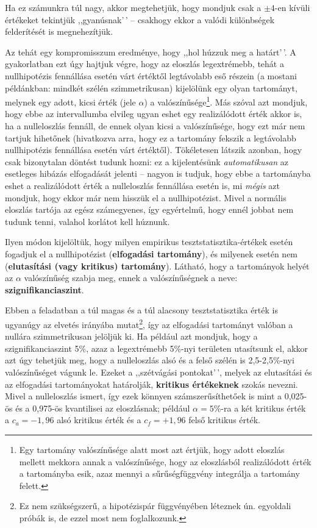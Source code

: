 \documentclass[
]{book}
\begin{document}
Ha ez számunkra túl nagy, akkor megtehetjük, hogy mondjuk csak a \(\pm 4\)-en kívüli értékeket tekintjük ,,gyanúsnak'\,' -- csakhogy ekkor a valódi különbségek felderítését is megnehezítjük.

Az tehát egy kompromisszum eredménye, hogy ,,hol húzzuk meg a határt'\,'. A gyakorlatban ezt úgy hajtjuk végre, hogy az eloszlás legextrémebb, tehát a nullhipotézis fennállása esetén várt értéktől legtávolabb eső részein (a mostani példánkban: mindkét szélén szimmetrikusan) kijelölünk egy olyan tartományt, melynek egy adott, kicsi érték (jele \(\alpha\)) a valószínűsége\footnote{Egy tartomány valószínűsége alatt most azt értjük, hogy adott eloszlás mellett mekkora annak a valószínűsége, hogy az eloszlásból realizálódott érték a tartományba esik, azaz mennyi a sűrűségfüggvény integrálja a tartomány felett.}. Más szóval azt mondjuk, hogy ebbe az intervallumba elvileg ugyan eshet egy realizálódott érték akkor is, ha a nulleloszlás fennáll, de ennek olyan kicsi a valószínűsége, hogy ezt már nem tartjuk hihetőnek (hivatkozva arra, hogy ez a tartomány fekszik a legtávolabb nullhipotézis fennállása esetén várt értéktől). Tökéletesen látszik azonban, hogy csak bizonytalan döntést tudunk hozni: ez a kijelentésünk \emph{automatikusan} az esetleges hibázás elfogadását jelenti -- nagyon is tudjuk, hogy ebbe a tartományba eshet a realizálódott érték a nulleloszlás fennállása esetén is, mi \emph{mégis} azt mondjuk, hogy ekkor már nem hisszük el a nullhipotézist. Mivel a normális eloszlás tartója az egész számegyenes, így egyértelmű, hogy ennél jobbat nem tudunk tenni, valahol korlátot kell húznunk.

Ilyen módon kijelöltük, hogy milyen empirikus tesztstatisztika-értékek esetén fogadjuk el a nullhipotézist (\textbf{elfogadási tartomány}), és milyenek esetén nem (\textbf{elutasítási (vagy kritikus) tartomány}). Látható, hogy a tartományok helyét az \(\alpha\) valószínűség szabja meg, ennek a valószínűségnek a neve: \textbf{szignifikanciaszint}.

Ebben a feladatban a túl magas és a túl alacsony tesztstatisztika érték is ugyanúgy az elvetés irányába mutat\footnote{Ez nem szükségszerű, a hipotézispár függvényében léteznek ún. egyoldali próbák is, de ezzel most nem foglalkozunk.}, így az elfogadási tartományt valóban a nullára szimmetrikusan jelöljük ki. Ha például azt mondjuk, hogy a szignifikanciaszint 5\%, azaz a legextrémebb 5\%-nyi területen utasítsunk el, akkor azt úgy tehetjük meg, hogy a nulleloszlás alsó és a felső szélén is 2,5-2,5\%-nyi valószínűséget vágunk le. Ezeket a ,,szétvágási pontokat'\,', melyek az elutasítási és az elfogadási tartományokat határolják, \textbf{kritikus értékeknek} szokás nevezni. Mivel a nulleloszlás ismert, így ezek könnyen számszerűsíthetőek is mint a 0,025-ös és a 0,975-ös kvantilisei az eloszlásnak; például \(\alpha=5\)\%-ra a két kritikus érték a \(c_a=-1,\!96\) alsó kritikus érték és a \(c_f=+1,\!96\) felső kritikus érték.
\end{document}
